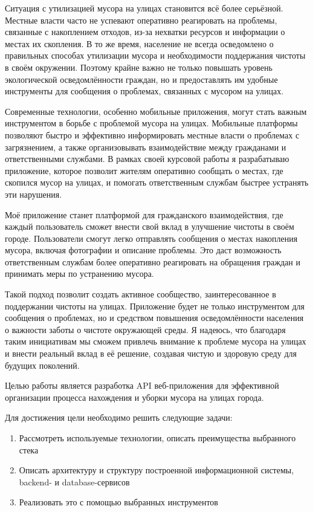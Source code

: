 \documentclass[coursework]{SCWorks}
\begin{document}
Ситуация с утилизацией мусора на улицах становится всё более серьёзной. 
Местные власти часто не успевают оперативно реагировать на проблемы, связанные 
с накоплением отходов, из-за нехватки ресурсов и информации о местах их 
скопления. В то же время, население не всегда осведомлено о правильных 
способах утилизации мусора и необходимости поддержания чистоты в своём 
окружении. Поэтому крайне важно не только повышать уровень экологической 
осведомлённости граждан, но и предоставлять им удобные инструменты для 
сообщения о проблемах, связанных с мусором на улицах.

Современные технологии, особенно мобильные приложения, могут стать важным 
инструментом в борьбе с проблемой мусора на улицах. Мобильные платформы 
позволяют быстро и эффективно информировать местные власти о проблемах с 
загрязнением, а также организовывать взаимодействие между гражданами и 
ответственными службами. В рамках своей курсовой работы я разрабатываю 
приложение, которое позволит жителям оперативно сообщать о местах, где 
скопился мусор на улицах, и помогать ответственным службам быстрее устранять 
эти нарушения.

Моё приложение станет платформой для гражданского взаимодействия, где каждый 
пользователь сможет внести свой вклад в улучшение чистоты в своём городе. 
Пользователи смогут легко отправлять сообщения о местах накопления мусора, 
включая фотографии и описание проблемы. Это даст возможность ответственным 
службам более оперативно реагировать на обращения граждан и принимать меры по 
устранению мусора.

Такой подход позволит создать активное сообщество, заинтересованное в 
поддержании чистоты на улицах. Приложение будет не только инструментом для 
сообщения о проблемах, но и средством повышения осведомлённости населения о 
важности заботы о чистоте окружающей среды. Я надеюсь, что благодаря таким 
инициативам мы сможем привлечь внимание к проблеме мусора на улицах и внести 
реальный вклад в её решение, создавая чистую и здоровую среду для будущих 
поколений.

Целью работы является разработка API веб-приложения для эффективной организации
процесса нахождения и уборки мусора на улицах города.

Для достижения цели необходимо решить следующие задачи:
\begin{enumerate}
    \item Рассмотреть используемые технологии, описать преимущества выбранного 
    стека
    \item Описать архитектуру и структуру построенной информационной системы, 
    backend- и database-сервисов
    \item Реализовать это с помощью выбранных инструментов
\end{enumerate}
\end{document}
